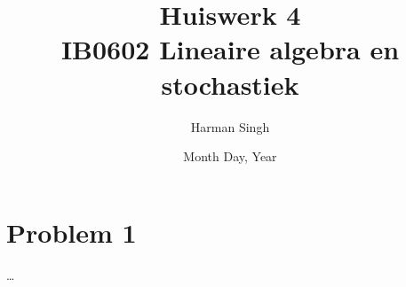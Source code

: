 \documentclass[11pt, a4paper]{article}
\title{Huiswerk 4 \\ IB0602 Lineaire algebra en stochastiek}
\author{Harman Singh}
\date{Month Day, Year}
\begin{document}
\maketitle

\pagebreak
\section*{Problem 1}





\ldots
\end{document}
